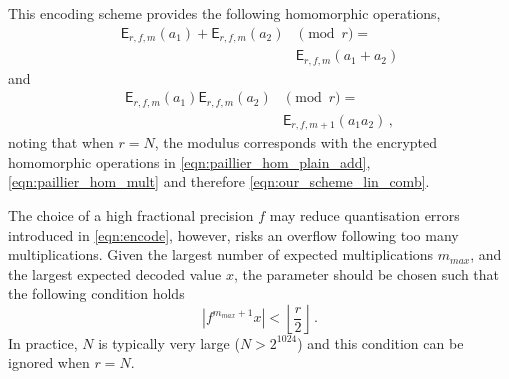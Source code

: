 \documentclass[twocolumn]{autart}
\begin{document}
This encoding scheme provides the following homomorphic operations,
\begin{equation}
    \begin{split}
        \mathsf{E}_{r,f,m}(a_1) + \mathsf{E}_{r,f,m}(a_2)& \pmod{r} =\\
        &\mathsf{E}_{r,f,m}(a_1+a_2)
    \end{split}\label{eqn:encoding_homomorphic_add}
\end{equation}
and
\begin{equation}
    \begin{split}
        \mathsf{E}_{r,f,m}(a_1)\mathsf{E}_{r,f,m}(a_2)& \pmod{r} =\\
        &\mathsf{E}_{r,f,m+1}(a_1a_2)\,,
    \end{split}
\end{equation}
noting that when $r=N$, the modulus corresponds with the encrypted homomorphic operations in \eqref{eqn:paillier_hom_plain_add}, \eqref{eqn:paillier_hom_mult} and therefore \eqref{eqn:our_scheme_lin_comb}.

The choice of a high fractional precision $f$ may reduce quantisation errors introduced in \eqref{eqn:encode}, however, risks an overflow following too many multiplications. Given the largest number of expected multiplications $m_{max}$, and the largest expected decoded value $x$, the parameter should be chosen such that the following condition holds
\begin{equation}
    \left|f^{m_{max}+1}x\right| < \left\lfloor \frac{r}{2} \right\rfloor\,.
\end{equation}
In practice, $N$ is typically very large ($N>2^{1024}$) and this condition can be ignored when $r=N$.

% 
% 
\end{document}
